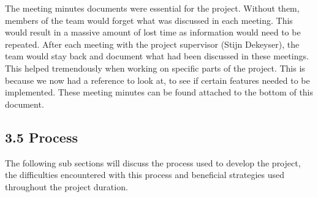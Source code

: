 \documentclass[11pt]{article}
\begin{document}
The meeting minutes documents were essential for the project. Without them, members of the team would forget what was discussed in each meeting. This would result in a massive amount of lost time as information would need to be repeated. After each meeting with the project supervisor (Stijn Dekeyser), the team would stay back and document what had been discussed in these meetings. This helped tremendously when working on specific parts of the project. This is because we now had a reference to look at, to see if certain features needed to be implemented. These meeting minutes can be found attached to the bottom of this document.


\subsection{3.5 Process}
The following sub sections will discuss the process used to develop the project, the difficulties encountered with this process and beneficial strategies used throughout the project duration.
\end{document}
